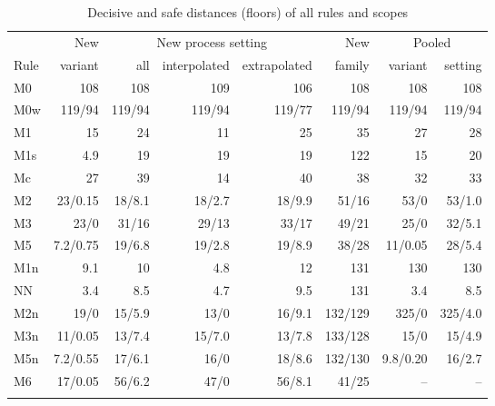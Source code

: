 \documentclass[pdflatex,sn-basic]{sn-jnl}
\newcommand{\tabsize}{\fontsize{8}{9.5}\selectfont}
\begin{document}
\begin{table}[tbp]
\tabsize
\setlength{\tabcolsep}{4pt}
\caption{Decisive and safe distances (floors) of all rules and scopes}\label{tab:alldist}
\begin{tabular}{@{}lrrrrrrr@{}}
\toprule
 & New & \multicolumn{3}{c}{New process setting} & New & \multicolumn{2}{c}{Pooled} \\
\cmidrule(lr){3-5}\cmidrule(lr){7-8}
Rule & variant & all & interpolated & extrapolated & family & variant & setting \\
\midrule
M0 & 108 & 108 & 109 & 106 & 108 & 108 & 108 \\
M0w & 119/94 & 119/94 & 119/94 & 119/77 & 119/94 & 119/94 & 119/94 \\
M1 & 15 & 24 & 11 & 25 & 35 & 27 & 28 \\
M1s & 4.9 & 19 & 19 & 19 & 122 & 15 & 20 \\
Mc & 27 & 39 & 14 & 40 & 38 & 32 & 33 \\
M2 & 23/0.15 & 18/8.1 & 18/2.7 & 18/9.9 & 51/16 & 53/0 & 53/1.0 \\
M3 & 23/0 & 31/16 & 29/13 & 33/17 & 49/21 & 25/0 & 32/5.1 \\
M5 & 7.2/0.75 & 19/6.8 & 19/2.8 & 19/8.9 & 38/28 & 11/0.05 & 28/5.4 \\
M1n & 9.1 & 10 & 4.8 & 12 & 131 & 130 & 130 \\
NN & 3.4 & 8.5 & 4.7 & 9.5 & 131 & 3.4 & 8.5 \\
M2n & 19/0 & 15/5.9 & 13/0 & 16/9.1 & 132/129 & 325/0 & 325/4.0 \\
M3n & 11/0.05 & 13/7.4 & 15/7.0 & 13/7.8 & 133/128 & 15/0 & 15/4.9 \\
M5n & 7.2/0.55 & 17/6.1 & 16/0 & 18/8.6 & 132/130 & 9.8/0.20 & 16/2.7 \\
M6 & 17/0.05 & 56/6.2 & 47/0 & 56/8.1 & 41/25 & -- & -- \\
\botrule
\end{tabular}
\end{table}
\end{document}
